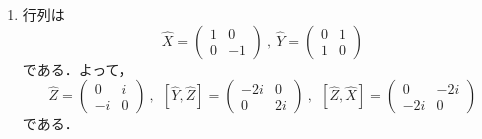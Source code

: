 \documentclass[a4paper,pdflatex,ja=standard]{bxjsarticle}
\begin{document}
\begin{enumerate}
  \item 
  行列は
  \begin{equation}
    \hat{X}
    =
    \begin{pmatrix}
      1 & 0 \\
      0 & -1
    \end{pmatrix}
    \ ,\ 
    \hat{Y}
    =
    \begin{pmatrix}
      0 & 1 \\
      1 & 0
    \end{pmatrix}
  \end{equation}
  である．よって，
  \begin{equation}
    \hat{Z}
    =
    \begin{pmatrix}
      0 & i \\
      -i & 0
    \end{pmatrix}
    \ ,\ \ 
    \left[ \hat{Y},\hat{Z} \right]
    =
    \begin{pmatrix}
      -2i & 0 \\
      0 & 2i
    \end{pmatrix}
    \ ,\ \ 
    \left[ \hat{Z},\hat{X} \right]
    =
    \begin{pmatrix}
      0 & -2i \\
      -2i & 0
    \end{pmatrix}
  \end{equation}
  である．


\end{enumerate}
\end{document}

